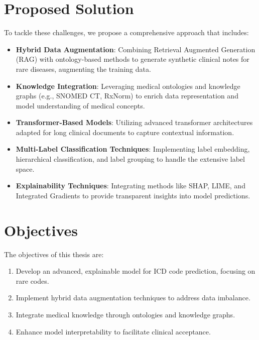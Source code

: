\documentclass[12pt,a4paper]{report}
\begin{document}
\section{Proposed Solution}
To tackle these challenges, we propose a comprehensive approach that includes:
\begin{itemize}
    \item \textbf{Hybrid Data Augmentation}: Combining Retrieval Augmented Generation (RAG) with ontology-based methods to generate synthetic clinical notes for rare diseases, augmenting the training data.
    \item \textbf{Knowledge Integration}: Leveraging medical ontologies and knowledge graphs (e.g., SNOMED CT, RxNorm) to enrich data representation and model understanding of medical concepts.
    \item \textbf{Transformer-Based Models}: Utilizing advanced transformer architectures adapted for long clinical documents to capture contextual information.
    \item \textbf{Multi-Label Classification Techniques}: Implementing label embedding, hierarchical classification, and label grouping to handle the extensive label space.
    \item \textbf{Explainability Techniques}: Integrating methods like SHAP, LIME, and Integrated Gradients to provide transparent insights into model predictions.
\end{itemize}

\section{Objectives}
The objectives of this thesis are:
\begin{enumerate}
    \item Develop an advanced, explainable model for ICD code prediction, focusing on rare codes.
    \item Implement hybrid data augmentation techniques to address data imbalance.
    \item Integrate medical knowledge through ontologies and knowledge graphs.
    \item Enhance model interpretability to facilitate clinical acceptance.
\end{enumerate}
\end{document}
